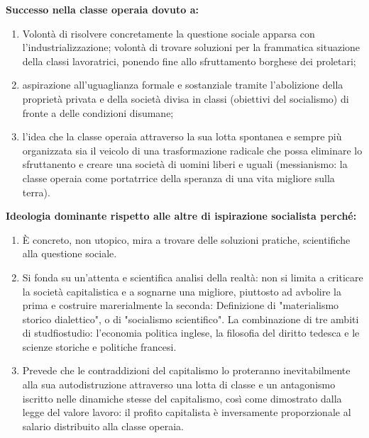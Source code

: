 \documentclass[a4paper]{article}
\begin{document}
\textbf{Successo nella classe operaia dovuto a:}
\begin{enumerate}
    \item Volontà di risolvere concretamente la questione sociale apparsa con l'industrializzazione; volontà di trovare soluzioni per la frammatica situazione della classi lavoratrici, ponendo fine allo sfruttamento borghese dei proletari;
    \item aspirazione all'uguaglianza formale e sostanziale tramite l'abolizione della proprietà privata e della società divisa in classi (obiettivi del socialismo) di fronte a delle condizioni disumane;
    \item l'idea che la classe operaia attraverso la sua lotta spontanea e sempre più organizzata sia il veicolo di una trasformazione radicale che possa eliminare lo sfruttanento e creare una società di uomini liberi e uguali (messianismo: la classe operaia come portatrrice della speranza di una vita migliore sulla terra).
\end{enumerate}

\textbf{Ideologia dominante rispetto alle altre di ispirazione socialista perché:}
\begin{enumerate}
    \item È concreto, non utopico, mira  a trovare delle soluzioni pratiche, scientifiche alla questione sociale.
    \item Si fonda su un'attenta e scientifica analisi della realtà: non si limita a criticare la società capitalistica e a sognarne una migliore, piuttosto ad avbolire la prima e costruire marerialmente la seconda:
        Definizione di "materialismo storico dialettico", o di "socialismo scientifico". La combinazione di tre ambiti di studfiostudio: l'economia politica inglese, la filosofia del diritto tedesca e le scienze storiche e politiche francesi.
    \item Prevede che le contraddizioni del capitalismo lo proteranno inevitabilmente alla sua autodistruzione attraverso una lotta di classe e un antagonismo iscritto nelle dinamiche stesse del capitalismo, così come dimostrato dalla legge del valore lavoro: il profito capitalista è inversamente proporzionale al salario distribuito alla classe operaia.
\end{enumerate}
\end{document}
